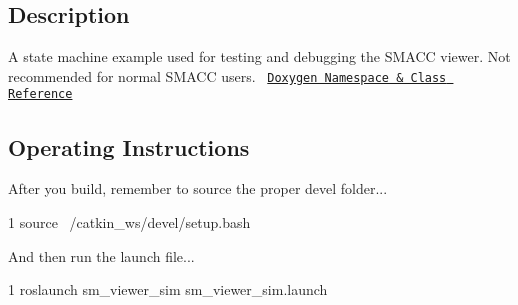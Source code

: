 \subsection*{Description}

A state machine example used for testing and debugging the S\+M\+A\+CC viewer. Not recommended for normal S\+M\+A\+CC users.~\newline
 \href{https://reelrbtx.github.io/SMACC/master/html/namespacesm__viewer__sim.html}{\tt Doxygen Namespace \& Class Reference}

\subsection*{Operating Instructions}

After you build, remember to source the proper devel folder...


\begin{DoxyCode}
1 source ~/catkin\_ws/devel/setup.bash
\end{DoxyCode}


And then run the launch file...


\begin{DoxyCode}
1 roslaunch sm\_viewer\_sim sm\_viewer\_sim.launch
\end{DoxyCode}
 
